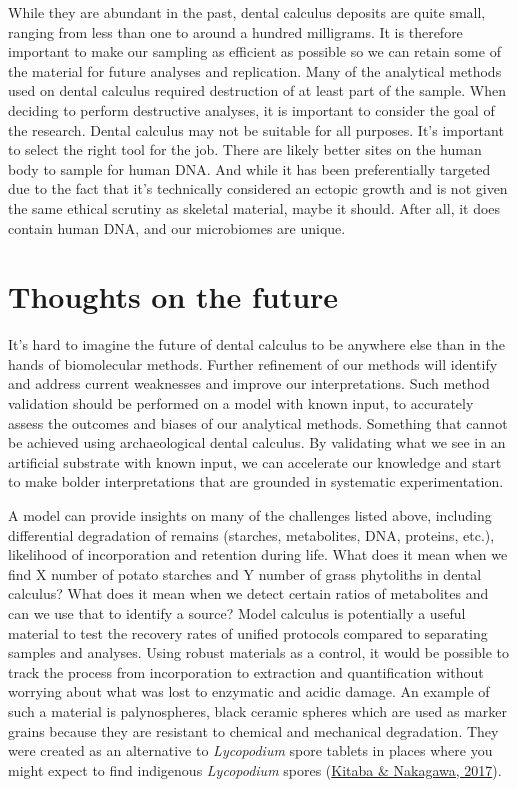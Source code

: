 \documentclass[
  letterpaper,
]{book}
\begin{document}
While they are abundant in the past, dental calculus deposits are quite
small, ranging from less than one to around a hundred milligrams. It is
therefore important to make our sampling as efficient as possible so we
can retain some of the material for future analyses and replication.
Many of the analytical methods used on dental calculus required
destruction of at least part of the sample. When deciding to perform
destructive analyses, it is important to consider the goal of the
research. Dental calculus may not be suitable for all purposes. It's
important to select the right tool for the job. There are likely better
sites on the human body to sample for human DNA. And while it has been
preferentially targeted due to the fact that it's technically considered
an ectopic growth and is not given the same ethical scrutiny as skeletal
material, maybe it should. After all, it does contain human DNA, and our
microbiomes are unique.

\hypertarget{thoughts-on-the-future}{%
\section{Thoughts on the future}\label{thoughts-on-the-future}}

It's hard to imagine the future of dental calculus to be anywhere else
than in the hands of biomolecular methods. Further refinement of our
methods will identify and address current weaknesses and improve our
interpretations. Such method validation should be performed on a model
with known input, to accurately assess the outcomes and biases of our
analytical methods. Something that cannot be achieved using
archaeological dental calculus. By validating what we see in an
artificial substrate with known input, we can accelerate our knowledge
and start to make bolder interpretations that are grounded in systematic
experimentation.

A model can provide insights on many of the challenges listed above,
including differential degradation of remains (starches, metabolites,
DNA, proteins, etc.), likelihood of incorporation and retention during
life. What does it mean when we find X number of potato starches and Y
number of grass phytoliths in dental calculus? What does it mean when we
detect certain ratios of metabolites and can we use that to identify a
source? Model calculus is potentially a useful material to test the
recovery rates of unified protocols compared to separating samples and
analyses. Using robust materials as a control, it would be possible to
track the process from incorporation to extraction and quantification
without worrying about what was lost to enzymatic and acidic damage. An
example of such a material is palynospheres, black ceramic spheres which
are used as marker grains because they are resistant to chemical and
mechanical degradation. They were created as an alternative to
\emph{Lycopodium} spore tablets in places where you might expect to find
indigenous \emph{Lycopodium} spores
(\protect\hyperlink{ref-kitabaBlackCeramic2017}{Kitaba \& Nakagawa,
2017}).
\end{document}
